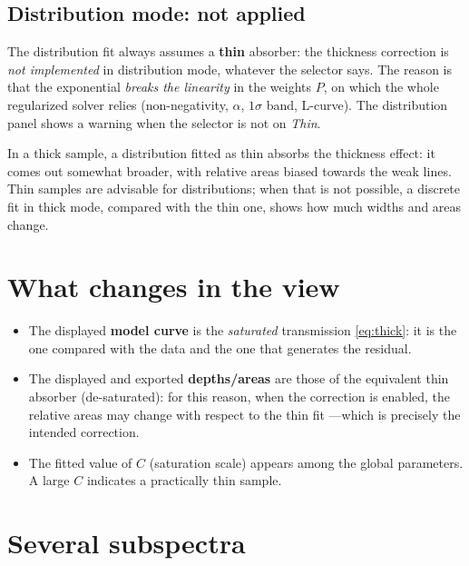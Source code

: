 \subsection{Distribution mode: not applied}
The distribution fit always assumes a \textbf{thin} absorber: the thickness
correction is \emph{not implemented} in distribution mode, whatever the selector
says. The reason is that the exponential \emph{breaks the linearity} in the weights
$P$, on which the whole regularized solver relies (non-negativity, $\alpha$,
$1\sigma$ band, L-curve). The distribution panel shows a warning when the selector
is not on \emph{Thin}.

In a thick sample, a distribution fitted as thin absorbs the thickness effect: it
comes out somewhat broader, with relative areas biased towards the weak lines.
Thin samples are advisable for distributions; when that is not possible, a
discrete fit in thick mode, compared with the thin one, shows how much widths
and areas change.

\section{What changes in the view}

\begin{itemize}[leftmargin=*]
  \item The displayed \textbf{model curve} is the \emph{saturated} transmission
        \eqref{eq:thick}: it is the one compared with the data and the one that
        generates the residual.
  \item The displayed and exported \textbf{depths/areas} are those of the
        equivalent thin absorber (de-saturated): for this reason, when the
        correction is enabled, the relative areas may change with respect to the thin
        fit —which is precisely the intended correction.
  \item The fitted value of $C$ (saturation scale) appears among the
        global parameters. A large $C$ indicates a practically thin sample.
\end{itemize}

\section{Several subspectra}

